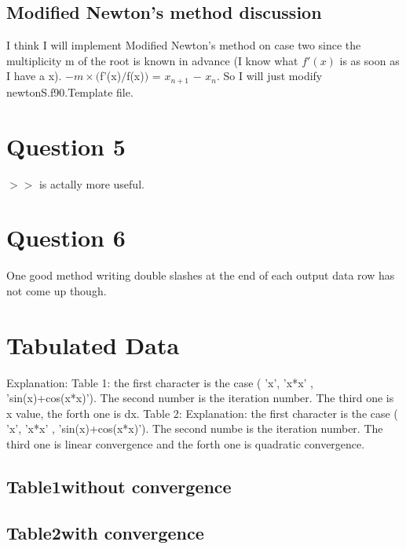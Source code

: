 \documentclass[titlepage]{article}
\begin{document}
\subsection{Modified Newton’s method discussion}
I think I will implement Modified Newton’s method on case two since
the multiplicity m of the root is known in advance (I know what $f'(x)$
is as soon as I have a x). $-$$m\times($f'(x)$/$f(x)$)$ = $x_{n+1}$
$-$ $x_{n}$. So I will just modify newtonS.f90.Template file.
\section{Question 5}
$>>$ is actally more useful.
\section{Question 6}
One good method writing double slashes at the end of each output data row has
not come up though.
\section {Tabulated Data}
Explanation: Table 1: the first character is the case ( 'x', 'x*x' ,
'sin(x)+cos(x*x)'). The second number is the iteration number. The
third one is x value, the forth one is dx. Table 2: Explanation: the first
character is the case ( 'x', 'x*x' , 'sin(x)+cos(x*x)'). The second
numbe is the iteration number. The third one is linear convergence 
and the forth one is quadratic convergence.
 
\subsection{Table1without convergence}

\begin{centering}
\begin{longtable}[h]
 
\hline
 \hline
  
 \hline
\hline

\end{longtable}
\end{centering}

\subsection{Table2with convergence}

\begin{centering}
\begin{longtable}[h]
 
\hline
 \hline
  
 \hline
\hline

\end{longtable}
\end{centering}
\end{document}
